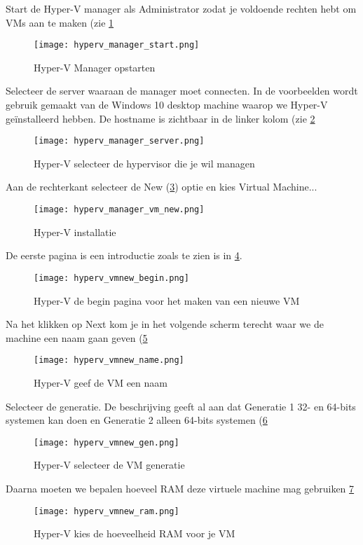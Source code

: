 Start de Hyper-V manager als Administrator zodat je voldoende rechten hebt om VMs aan te maken (zie \ref{HV_man_start}
\begin{figure}[H]
	\centering
	\texttt{[image: hyperv\_manager\_start.png]}
	\caption{Hyper-V Manager opstarten}
	\label{HV_man_start}
\end{figure}

Selecteer de server waaraan de manager moet connecten. In de voorbeelden wordt gebruik gemaakt van de Windows 10 desktop machine waarop we Hyper-V ge\"installeerd hebben. De hostname is zichtbaar in de linker kolom (zie \ref{HV_man_server}
\begin{figure}[H]
	\centering
	\texttt{[image: hyperv\_manager\_server.png]}
	\caption{Hyper-V selecteer de hypervisor die je wil managen}
	\label{HV_man_server}
\end{figure}

Aan de rechterkant selecteer de New (\ref{HV_man_vm_new}) optie en kies Virtual Machine...
\begin{figure}[H]
	\centering
	\texttt{[image: hyperv\_manager\_vm\_new.png]}
	\caption{Hyper-V installatie}
	\label{HV_man_vm_new}
\end{figure}

De eerste pagina is een introductie zoals te zien is in \ref{HV_vmnew_begin}.
\begin{figure}[H]
	\centering
	\texttt{[image: hyperv\_vmnew\_begin.png]}
	\caption{Hyper-V de begin pagina voor het maken van een nieuwe VM}
	\label{HV_vmnew_begin}
\end{figure}

Na het klikken op Next kom je in het volgende scherm terecht waar we de machine een naam gaan geven (\ref{HV_vmnew_name}
\begin{figure}[H]
	\centering
	\texttt{[image: hyperv\_vmnew\_name.png]}
	\caption{Hyper-V geef de VM een naam}
	\label{HV_vmnew_name}
\end{figure}

Selecteer de generatie. De beschrijving geeft al aan dat Generatie 1 32- en 64-bits systemen kan doen en Generatie 2 alleen 64-bits systemen (\ref{HV_vmnew_gen}
\begin{figure}[H]
	\centering
	\texttt{[image: hyperv\_vmnew\_gen.png]}
	\caption{Hyper-V selecteer de VM generatie}
	\label{HV_vmnew_gen}
\end{figure}

Daarna moeten we bepalen hoeveel RAM deze virtuele machine mag gebruiken \ref{HV_vmnew_ram}
\begin{figure}[H]
	\centering
	\texttt{[image: hyperv\_vmnew\_ram.png]}
	\caption{Hyper-V kies de hoeveelheid RAM voor je VM}
	\label{HV_vmnew_ram}
\end{figure}

